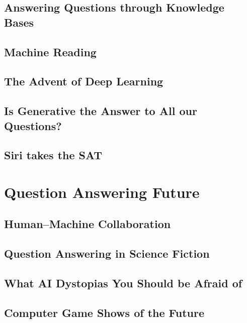 \documentclass[bfivepaper,twosided,justified,nobib]{style/tufte-book}
\newif\ifproposal\proposalfalse
\newcommand{\proposalpart}[1]{
  \ifproposal
  \subsection{#1}
  \else
  \part{#1}
  \fi
}
\newcommand{\chapterfile}[3]{
  \ifproposal
  \paragraph{#3}
  
  \else
  \chapter{#3}
  \label{ch:#1}
  \begin{quote}
    
  \end{quote}
  
  \fi}
\begin{document}
\chapterfile{270}{methods_kb}{Answering Questions through Knowledge
  Bases}
\chapterfile{271}{methods_mr}{Machine Reading}
\chapterfile{272}{methods_deep_retrieval}{The Advent of Deep Learning}
\chapterfile{273}{methods_generation}{Is Generative  the Answer to All
our Questions?}

\chapterfile{280}{leaderboards}{Siri takes the SAT}







\proposalpart{Question Answering Future}

\chapterfile{300}{datasets_adversarial}{Human--Machine Collaboration}

\chapterfile{310}{sci_fi}{Question Answering in Science Fiction}

\chapterfile{330}{fear_of_a_bot_planet}{What AI Dystopias You Should
  be Afraid of}




\chapterfile{340}{gameshow}{Computer Game Shows of the Future}


\fi




\backmatter





\printindex
\end{document}
